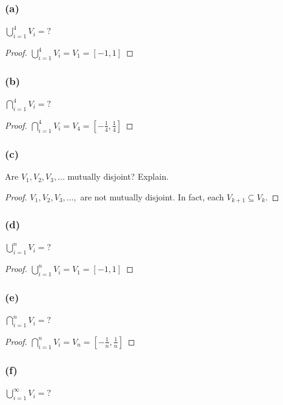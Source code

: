 \documentclass[14pt]{extarticle}
\newcommand{\dps}{\displaystyle}
\begin{document}
\subsubsection{(a)}
\(\dps \bigcup_{i=1}^{4}V_i = ?\)

\begin{proof}
\(\dps \bigcup_{i=1}^{4}V_i = V_1 = [-1, 1]\)
\end{proof}

\subsubsection{(b)}
\(\dps \bigcap_{i=1}^{4}V_i = ?\)

\begin{proof}
\(\dps \bigcap_{i=1}^{4}V_i = V_4 = \left[-\frac{1}{4}, \frac{1}{4}\right]\)
\end{proof}

\subsubsection{(c)}
Are \(V_1, V_2, V_3, \ldots\) mutually disjoint? Explain.

\begin{proof}
$V_1, V_2, V_3, \ldots,$ are not mutually disjoint. In fact, each \(V_{k+1} \subseteq V_k\).
\end{proof}

\subsubsection{(d)}
\(\dps \bigcup_{i=1}^{n}V_i = ?\)

\begin{proof}
\(\dps \bigcup_{i=1}^{n}V_i = V_1 = [-1, 1]\)
\end{proof}

\subsubsection{(e)}
\(\dps \bigcap_{i=1}^{n}V_i = ?\)

\begin{proof}
\(\dps \bigcap_{i=1}^{n}V_i = V_n = \left[-\frac{1}{n}, \frac{1}{n}\right]\)
\end{proof}

\subsubsection{(f)}
\(\dps \bigcup_{i=1}^{\infty}V_i = ?\)
\end{document}
